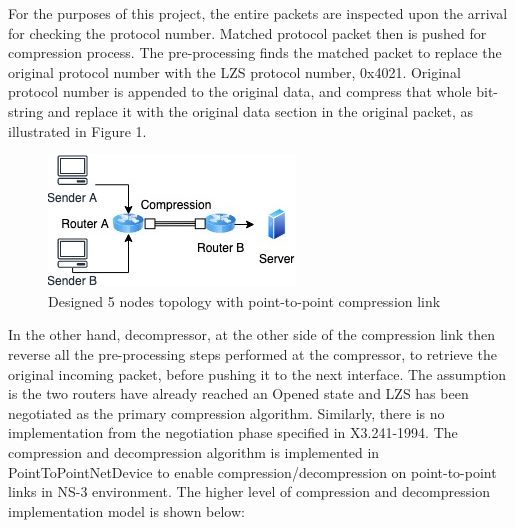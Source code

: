 \documentclass[sigconf]{acmart}
\begin{document}
 
 
For the purposes of this project, the entire packets are inspected upon the arrival for checking the protocol number.  Matched protocol packet then is pushed for compression process. The pre-processing  finds the matched packet to replace the original protocol number with the LZS protocol number, 0x4021. Original protocol number is appended to the original data, and compress that whole bit-string and replace it with the original data section in the original packet, as illustrated in Figure 1. 

\begin{figure}[h]
  \centering
  \includegraphics[width=\linewidth]{Topology}
  \caption{Designed 5 nodes topology with point-to-point compression link }
\end{figure}

In the other hand, decompressor, at the other side of the compression link then reverse all the pre-processing steps performed at the compressor, to retrieve the original incoming packet, before pushing it to the next interface. The assumption is the two routers have already reached an Opened state and LZS has been negotiated as the primary compression algorithm. Similarly, there is no implementation from the negotiation phase specified in X3.241-1994. The compression and decompression algorithm is implemented in PointToPointNetDevice to enable compression/decompression on point-to-point links in NS-3 environment. The higher level of compression and decompression implementation model is shown below:
\end{document}
